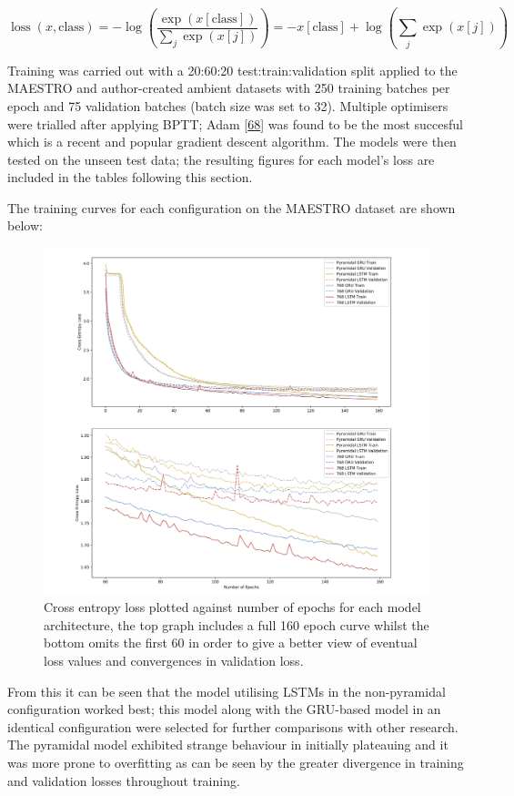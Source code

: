 \documentclass[12pt,]{article}
\begin{document}
\[
\operatorname{loss}(x, \text {class})=-\log \left(\frac{\exp (x[\text{class}])}{\sum_{j} \exp (x[j])}\right)=-x[\text {class}]+\log \left(\sum_{j} \exp (x[j])\right)
\]

Training was carried out with a 20:60:20 test:train:validation split
applied to the MAESTRO and author-created ambient datasets with 250
training batches per epoch and 75 validation batches (batch size was set
to 32). Multiple optimisers were trialled after applying BPTT; Adam
{[}\protect\hyperlink{ref-kingma2014adam}{68}{]} was found to be the
most succesful which is a recent and popular gradient descent algorithm.
The models were then tested on the unseen test data; the resulting
figures for each model's loss are included in the tables following this
section.

The training curves for each configuration on the MAESTRO dataset are
shown below:

\begin{figure}
\centering
\includegraphics{Images/loss.png}
\caption{Cross entropy loss plotted against number of epochs for each
model architecture, the top graph includes a full 160 epoch curve whilst
the bottom omits the first 60 in order to give a better view of eventual
loss values and convergences in validation loss.}
\end{figure}

From this it can be seen that the model utilising LSTMs in the
non-pyramidal configuration worked best; this model along with the
GRU-based model in an identical configuration were selected for further
comparisons with other research. The pyramidal model exhibited strange
behaviour in initially plateauing and it was more prone to overfitting
as can be seen by the greater divergence in training and validation
losses throughout training.
\end{document}

